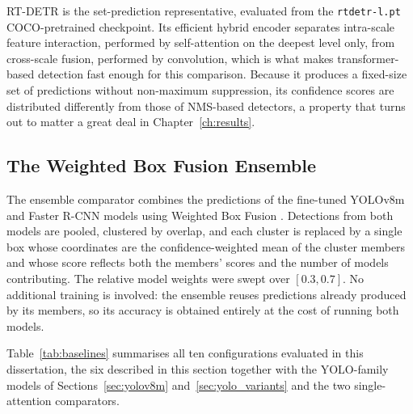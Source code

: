 \documentclass[MScCS]{uccthesis}
\begin{document}
RT-DETR \parencite{zhao2024rtdetr} is the set-prediction representative,
evaluated from the \texttt{rtdetr-l.pt} COCO-pretrained checkpoint. Its
efficient hybrid encoder separates intra-scale feature interaction, performed
by self-attention on the deepest level only, from cross-scale fusion, performed
by convolution, which is what makes transformer-based detection fast enough for
this comparison. Because it produces a fixed-size set of predictions without
non-maximum suppression, its confidence scores are distributed differently from
those of NMS-based detectors, a property that turns out to matter a great
deal in Chapter~\ref{ch:results}.

\subsection{The Weighted Box Fusion Ensemble}

The ensemble comparator combines the predictions of the fine-tuned YOLOv8m and
Faster R-CNN models using Weighted Box Fusion
\parencite{solovyev2021weighted}. Detections from both models are pooled,
clustered by overlap, and each cluster is replaced by a single box whose
coordinates are the confidence-weighted mean of the cluster members and whose
score reflects both the members' scores and the number of models contributing.
The relative model weights were swept over $[0.3, 0.7]$. No additional training
is involved: the ensemble reuses predictions already produced by its members,
so its accuracy is obtained entirely at the cost of running both models.

Table~\ref{tab:baselines} summarises all ten configurations evaluated in this
dissertation, the six described in this section together with the YOLO-family
models of Sections~\ref{sec:yolov8m} and~\ref{sec:yolo_variants} and the two
single-attention comparators.
\end{document}
